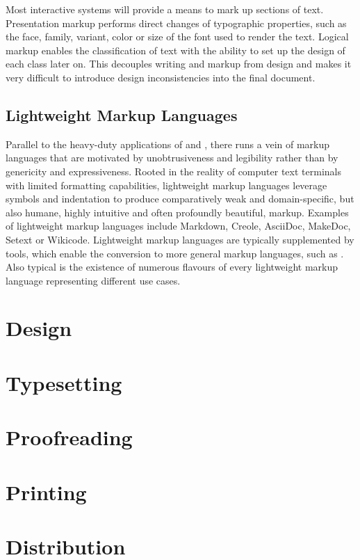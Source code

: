\documentclass{book}
\begin{document}
        Most interactive systems will provide a means to mark up sections of
        text. Presentation markup performs direct changes of typographic
        properties, such as the face, family, variant, color or size
        of the font used to render the text. Logical markup enables the
        classification of text with the ability to set up the design of each
        class later on. This decouples writing and markup from design and makes
        it very difficult to introduce design inconsistencies into the final
        document.



      \section{Lightweight Markup Languages}
        Parallel to the heavy-duty applications of  and
        , there runs a vein of markup languages that are motivated
        by unobtrusiveness and legibility rather than by genericity and
        expressiveness. Rooted in the reality of computer text terminals with
        limited formatting capabilities, lightweight markup languages leverage
        symbols and indentation to produce comparatively weak and
        domain-specific, but also humane, highly intuitive and often profoundly
        beautiful, markup.  Examples of lightweight markup languages include
        Markdown, Creole, AsciiDoc, MakeDoc, Setext or Wikicode. Lightweight
        markup languages are typically supplemented by tools, which enable the
        conversion to more general markup languages, such as .
        Also typical is the existence of numerous flavours of every lightweight
        markup language representing different use cases.


    \chapter{Design}
    \chapter{Typesetting}
    \chapter{Proofreading}
    \chapter{Printing}
    \chapter{Distribution}
\end{document}
